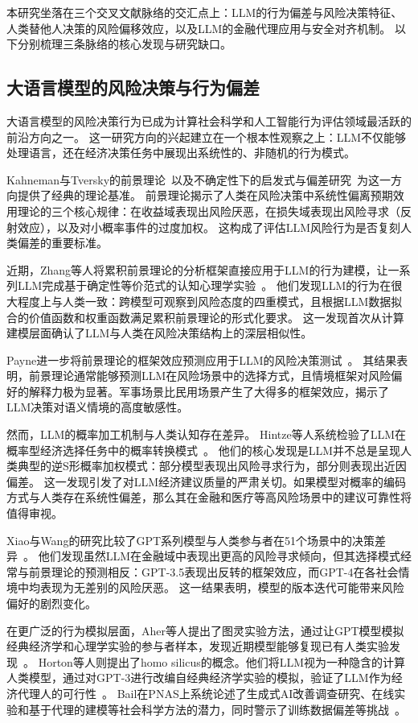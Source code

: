 \documentclass[journal]{vgtc}
\begin{document}
本研究坐落在三个交叉文献脉络的交汇点上：LLM的行为偏差与风险决策特征、人类替他人决策的风险偏移效应，以及LLM的金融代理应用与安全对齐机制。
以下分别梳理三条脉络的核心发现与研究缺口。

\subsection{大语言模型的风险决策与行为偏差}

大语言模型的风险决策行为已成为计算社会科学和人工智能行为评估领域最活跃的前沿方向之一。
这一研究方向的兴起建立在一个根本性观察之上：LLM不仅能够处理语言，还在经济决策任务中展现出系统性的、非随机的行为模式。

Kahneman与Tversky的前景理论~\cite{Kahneman1979Prospect}以及不确定性下的启发式与偏差研究~\cite{Tversky1974Judgment}为这一方向提供了经典的理论基准。
前景理论揭示了人类在风险决策中系统性偏离预期效用理论的三个核心规律：在收益域表现出风险厌恶，在损失域表现出风险寻求（反射效应），以及对小概率事件的过度加权。
这构成了评估LLM风险行为是否复刻人类偏差的重要标准。

近期，Zhang等人将累积前景理论的分析框架直接应用于LLM的行为建模，让一系列LLM完成基于确定性等价范式的认知心理学实验~\cite{Zhang2025Using}。
他们发现LLM的行为在很大程度上与人类一致：跨模型可观察到风险态度的四重模式，且根据LLM数据拟合的价值函数和权重函数满足累积前景理论的形式化要求。
这一发现首次从计算建模层面确认了LLM与人类在风险决策结构上的深层相似性。

Payne进一步将前景理论的框架效应预测应用于LLM的风险决策测试~\cite{Payne2025Analysis}。
其结果表明，前景理论通常能够预测LLM在风险场景中的选择方式，且情境框架对风险偏好的解释力极为显著。军事场景比民用场景产生了大得多的框架效应，揭示了LLM决策对语义情境的高度敏感性。

然而，LLM的概率加工机制与人类认知存在差异。
Hintze等人系统检验了LLM在概率型经济选择任务中的概率转换模式~\cite{Hintze2025Nonlinear}。
他们的核心发现是LLM并不总是呈现人类典型的逆S形概率加权模式：部分模型表现出风险寻求行为，部分则表现出近因偏差。
这一发现引发了对LLM经济建议质量的严肃关切。如果模型对概率的编码方式与人类存在系统性偏差，那么其在金融和医疗等高风险场景中的建议可靠性将值得审视。

Xiao与Wang的研究比较了GPT系列模型与人类参与者在51个场景中的决策差异~\cite{Xiao2025Evaluating}。
他们发现虽然LLM在金融域中表现出更高的风险寻求倾向，但其选择模式经常与前景理论的预测相反：GPT-3.5表现出反转的框架效应，而GPT-4在各社会情境中均表现为无差别的风险厌恶。
这一结果表明，模型的版本迭代可能带来风险偏好的剧烈变化。

在更广泛的行为模拟层面，Aher等人提出了图灵实验方法，通过让GPT模型模拟经典经济学和心理学实验的参与者样本，发现近期模型能够复现已有人类实验发现~\cite{Aher2023Using}。
Horton等人则提出了homo silicus的概念。他们将LLM视为一种隐含的计算人类模型，通过对GPT-3进行改编自经典经济学实验的模拟，验证了LLM作为经济代理人的可行性~\cite{Horton2024Large}。
Bail在PNAS上系统论述了生成式AI改善调查研究、在线实验和基于代理的建模等社会科学方法的潜力，同时警示了训练数据偏差等挑战~\cite{Bail2024Can}。
\end{document}
